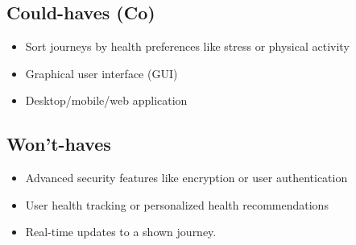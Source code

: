 \subsection{Could-haves (Co)}\label{subsec:could-haves}

\begin{itemize}
    \item Sort journeys by health preferences like stress or physical activity
    \item Graphical user interface (GUI)
    \item Desktop/mobile/web application
\end{itemize}
\subsection{Won't-haves}\label{subsec:wont-haves}

\begin{itemize}
    \item Advanced security features like encryption or user authentication
    \item User health tracking or personalized health recommendations
    \item Real-time updates to a shown journey.
\end{itemize}
